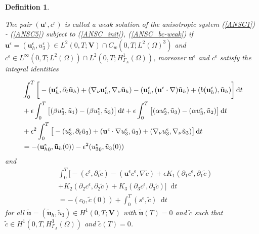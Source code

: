 \documentclass[11pt]{article}
\newtheorem{definition}{Definition}
\newcommand*\diff{\mathop{}\!\mathrm{d}}
\begin{document}
\begin{definition} \label{definitionanisotropicWF}

The pair $(\mathbf{u}^\epsilon, c^\epsilon)$ is called a weak solution of the anisotropic system (\ref{ANSC1}) - (\ref{ANSC5}) subject to (\ref{ANSC_init}), (\ref{ANSC_bc-weak}) if $\mathbf{u}^\epsilon = (\mathbf{u}^\epsilon_h, u^\epsilon_3) \in L^2 (0,T ; \mathbf{V}) \cap C_w (0, T; L^2 (\Omega)^3)$ and $c^\epsilon \in L^\infty (0,T; L^2(\Omega)) \cap L^2 (0,T; H_{\Gamma_A}^1(\Omega))$, moreover $\mathbf{u}^\epsilon$ and $c^\epsilon$ satisfy the integral identities

\begin{equation}
\begin{split}
& \int_0^T \bigg [ -(\mathbf{u}^\epsilon_h, \partial_t \mathbf{\tilde{u}}_h) + (\nabla_\nu \mathbf{u}^\epsilon_h, \nabla_\nu \mathbf{\tilde{u}}_h) - (\mathbf{u}^\epsilon_h, (\mathbf{u}^\epsilon \cdot \nabla) \mathbf{\tilde{u}}_h) + (b(\mathbf{u}^\epsilon_h), \mathbf{\tilde{u}}_h) \bigg ] \diff t \\
& + \epsilon \int_0 ^ T \big [ (\beta u_3 ^\epsilon, \tilde{u}_1) - (\beta u_1^\epsilon, \tilde{u}_3) \big ] \diff t + \epsilon \int_0 ^ T \big [ (\alpha u_2 ^\epsilon, \tilde{u}_3) - (\alpha u_3^\epsilon, \tilde{u}_2) \big ] \diff t \\
& + \epsilon^2 \int _0 ^ T \big [ -(u_3^\epsilon, \partial_t \tilde{u}_3) +(\mathbf{u}^\epsilon \cdot \nabla u_3 ^ \epsilon, \tilde{u}_3) + (\nabla_\nu u_3^\epsilon, \nabla_\nu \tilde{u}_3) \big ] \diff t \\
& = - ({\mathbf{u}^\epsilon_h}_0, \mathbf{\tilde{u}}_h(0)) - \epsilon^2 ({u^\epsilon_3}_0, \tilde{u}_3 (0)) \raisetag{20pt} \label{anisotropicWF}
\end{split}
\end{equation}
%
and
%
\begin{equation}
\begin{split} \nonumber
& \int_0^T \bigg [ -(c^\epsilon, \partial_t \tilde{c}) -(\mathbf{u}^\epsilon c^\epsilon, \nabla \tilde{c}) + \epsilon K_1 (\partial_1 c^\epsilon, \partial_1 \tilde{c}) \\
& + K_2 (\partial_2 c^\epsilon, \partial_2 \tilde{c}) + K_3 (\partial_3 c^\epsilon, \partial_3 \tilde{c}) \bigg ] \diff t \\
& = - (c_0, \tilde{c} (0)) + \int_0^T (s^\epsilon,\tilde{c}) \diff t
\end{split}
\end{equation}
%
for all $\mathbf{\tilde{u}} = (\mathbf{\tilde{u}}_h, \tilde{u}_3) \in H^1 (0,T;\mathbf{V})$ with $\mathbf{\tilde{u}}(T) = 0$ and $\tilde{c}$ such that $\tilde{c} \in H^1 (0,T, H^3_{\Gamma_A} (\Omega))$ and $\tilde{c} (T) = 0$.

\end{definition}
\end{document}
